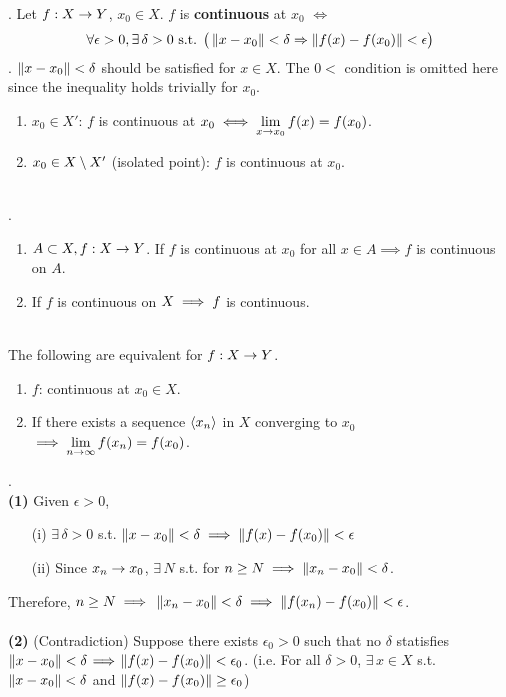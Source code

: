 . Let $f: X\rightarrow Y$, $x_0\in X$. $f$ is \textbf{continuous} at $x_0$ $\iff$ $$\forall \epsilon>0, \exists\,\delta>0 \text{ s.t. } \big(\left\lVert x-x_0\right\rVert < \delta \Rightarrow \left\lVert f(x) - f(x_0)\right\rVert < \epsilon\big)$$
\rmk. $\left\lVert x - x_0\right\rVert < \delta$ should be satisfied for $x\in X$. The $0 <$ condition is omitted here since the inequality holds trivially for $x_0$.
\begin{enumerate}
	\item $x_0\in X'$: $f$ is continuous at $x_0 \iff \displaystyle \lim_{x\rightarrow x_0} f(x) = f(x_0)$.
	\item $x_0\in X \setminus X'$ (isolated point): $f$ is continuous at $x_0$. 
\end{enumerate}~\\
.
\begin{enumerate}
	\item $A\subset X, f:X\rightarrow Y$. If $f$ is continuous at $x_0$ for all $x\in A \implies f$ is continuous on $A$.
	\item If $f$ is continuous on $X \implies f$ is continuous.
\end{enumerate}~\\
 The following are equivalent for $f:X\rightarrow Y$.
\begin{enumerate}
	\item $f$: continuous at $x_0\in X$.
	\item If there exists a sequence $\left\langle x_n \right\rangle$ in $X$ converging to $x_0$ $\implies\displaystyle \lim_{n\rightarrow\infty} f(x_n) = f(x_0)$.
\end{enumerate}
\pf.\\
\textbf{(1)} Given $\epsilon >0$,
\begin{enumerate}
	\item[(i)] $\exists\, \delta>0$ s.t. $\left\lVert x-x_0\right\rVert < \delta \implies \left\lVert f(x) - f(x_0)\right\rVert < \epsilon$
	\item[(ii)] Since $x_n\rightarrow x_0$, $\exists\, N$ s.t. for $n\geq N \implies \left\lVert x_n-x_0\right\rVert < \delta$.
\end{enumerate}
Therefore, $n\geq N \implies$ $\left\lVert x_n-x_0\right\rVert < \delta \implies \left\lVert f(x_n) - f(x_0)\right\rVert < \epsilon$.\\
\\
\textbf{(2)} (Contradiction) Suppose there exists $\epsilon_0 > 0$ such that no $\delta$ statisfies $\left\lVert x-x_0\right\rVert < \delta \!\implies\! \left\lVert f(x) - f(x_0)\right\rVert < \epsilon_0$. (i.e. For all $\delta> 0$, $\exists\, x\in X$ s.t. $\left\lVert x - x_0\right\rVert < \delta$ and $\left\lVert f(x) - f(x_0)\right\rVert \geq \epsilon_0$)\\
\\
